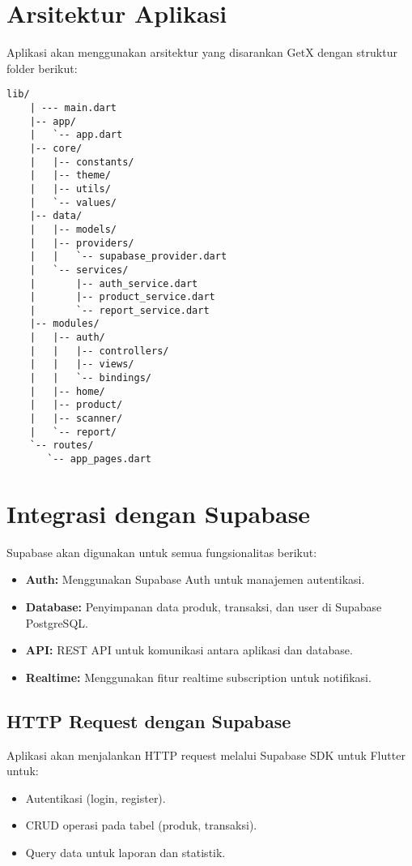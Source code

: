 \documentclass[a4paper,12pt]{article}
\begin{document}
\section{Arsitektur Aplikasi}
Aplikasi akan menggunakan arsitektur yang disarankan GetX dengan struktur folder berikut:
\begin{verbatim}
lib/
	| --- main.dart
	|-- app/
	|   `-- app.dart
	|-- core/
	|   |-- constants/
	|   |-- theme/
	|   |-- utils/
	|   `-- values/
	|-- data/
	|   |-- models/
	|   |-- providers/
	|   |   `-- supabase_provider.dart
	|   `-- services/
	|       |-- auth_service.dart
	|       |-- product_service.dart
	|       `-- report_service.dart
	|-- modules/
	|   |-- auth/
	|   |   |-- controllers/
	|   |   |-- views/
	|   |   `-- bindings/
	|   |-- home/
	|   |-- product/
	|   |-- scanner/
	|   `-- report/
	`-- routes/
 	   `-- app_pages.dart
\end{verbatim}

\section{Integrasi dengan Supabase}
Supabase akan digunakan untuk semua fungsionalitas berikut:
\begin{itemize}[leftmargin=1.5cm]
    \item \textbf{Auth:} Menggunakan Supabase Auth untuk manajemen autentikasi.
    \item \textbf{Database:} Penyimpanan data produk, transaksi, dan user di Supabase PostgreSQL.
    \item \textbf{API:} REST API untuk komunikasi antara aplikasi dan database.
    \item \textbf{Realtime:} Menggunakan fitur realtime subscription untuk notifikasi.
\end{itemize}

\subsection{HTTP Request dengan Supabase}
Aplikasi akan menjalankan HTTP request melalui Supabase SDK untuk Flutter untuk:
\begin{itemize}[leftmargin=1.5cm]
    \item Autentikasi (login, register).
    \item CRUD operasi pada tabel (produk, transaksi).
    \item Query data untuk laporan dan statistik.
\end{itemize}
\end{document}
